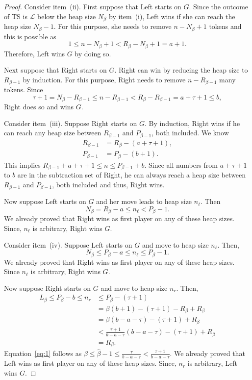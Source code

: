\documentclass[10pt,a4paper]{amsart}
\newcommand{\hbeta}{\widehat\beta}
\newcommand{\lp}{\mathscr{L}}
\newcommand{\rp}{\mathscr{R}}
\newcommand{\ts}{\mathcal{T}}
\begin{document}
\begin{proof}
    Consider item~(ii). First suppose that Left starts on $G$. Since the outcome of {\sc TS} is $\lp$ below the heap size $N_\beta$ by item~(i), Left wins if she can reach the heap size $N_\beta-1$. For this purpose, she needs to remove $n-N_\beta+1$ tokens %
    and this is possible as $$1\le n-N_\beta+1< R_\beta-N_\beta+1=a+1.$$ Therefore, Left wins $G$ by doing so. 
    
    Next suppose that Right starts on $G$. 
    Right can win by reducing the heap size to $R_{\beta-1}$ by induction. For this purpose, Right needs to remove $n-R_{\beta-1}$ many tokens. Since $$\tau+1=N_\beta-R_{\beta-1}\le n-R_{\beta-1}<R_\beta-R_{\beta-1}=a+\tau+1\le b,$$ Right does so and wins $G$. %

    Consider item~(iii). Suppose Right starts on $G$. %
    By induction, Right wins if he can reach any heap size between $R_{\beta-1}$ and $P_{\beta-1}$, both included. We know \begin{align*}
        R_{\beta-1}&=R_\beta-(a+\tau+1),\\
        P_{\beta-1}&=P_\beta-(b+1).
    \end{align*}This implies $R_{\beta-1}+a+\tau+1\le n\le P_{\beta-1}+b$. Since all numbers from $a+\tau+1$ to $b$ are in the subtraction set of Right, he can always reach a heap size between $R_{\beta-1}$ and $P_{\beta-1}$, both included and thus, Right wins. 
    
    Now suppose Left starts on $G$ and her move leads to heap size $n_\ell$. Then $$N_\beta=R_\beta-a\le n_\ell< P_\beta-1.$$ We already proved that Right wins as first player on any of these heap sizes. Since, $n_\ell$ is arbitrary, Right wins $G$. 

    Consider item~(iv). Suppose Left starts on $G$ and move to heap size $n_\ell$. Then, $$N_\beta\le P_\beta-a\le n_\ell\le P_\beta-1.$$ We already proved that Right wins as first player on any of these heap sizes. Since $n_\ell$ is arbitrary, Right wins $G$. 
    
    Now suppose Right starts on $G$ and move to heap size $n_r$. Then, \begin{align}
        L_\beta\le P_\beta-b\le n_r&\le P_\beta-(\tau+1)\nonumber\\
        &=\beta(b+1)-(\tau+1)-R_\beta+R_\beta\nonumber\\
        &=\beta(b-a-\tau)-(\tau+1)+R_\beta\nonumber\\
        &<\frac{\tau+1}{b-a-\tau}(b-a-\tau)-(\tau+1)+R_\beta\label{eq:1}\\
        &=R_\beta\nonumber.
    \end{align}
    Equation~\eqref{eq:1} follows as $\beta\le \hbeta-1\le \frac{\tau}{b-a-\tau}<\frac{\tau+1}{b-a-\tau}$. We already proved that Left wins as first player on any of these heap sizes. Since, $n_r$ is arbitrary, Left wins $G$. 
\end{proof}
\end{document}
